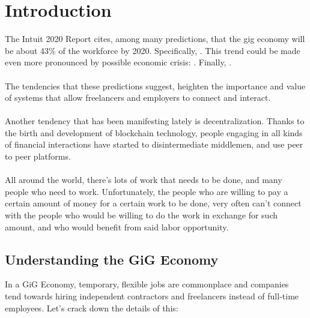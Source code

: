 \documentclass{article}
\begin{document}
\newpage
\tableofcontents
\newpage

\section{Introduction}

The Intuit 2020 Report\cite{intuit-2020-report} cites, among many predictions, that the gig economy will be about 43\% of the workforce by 2020. Specifically, . This trend could be made even more pronounced by possible economic crisis: . Finally, .

\paragraph{}The tendencies that these predictions suggest, heighten the importance and value of systems that allow freelancers and employers to connect and interact.

\paragraph{}Another tendency that has been manifesting lately is decentralization. Thanks to the birth and development of blockchain technology, people engaging in all kinds of financial interactions have started to disintermediate middlemen, and use peer to peer platforms.

\paragraph{} All around the world, there's lots of work that needs to be done, and many people who need to work. Unfortunately, the people who are willing to pay a certain amount of money for a certain work to be done, very often can't connect with the people who would be willing to do the work in exchange for such amount, and who would benefit from said labor opportunity.

\subsection{Understanding the GiG Economy}
In a GiG Economy, temporary, flexible jobs are commonplace and companies tend towards hiring independent contractors and freelancers instead of full-time employees\cite{gig-economy-investopedia}. Let's crack down the details of this:
\end{document}
